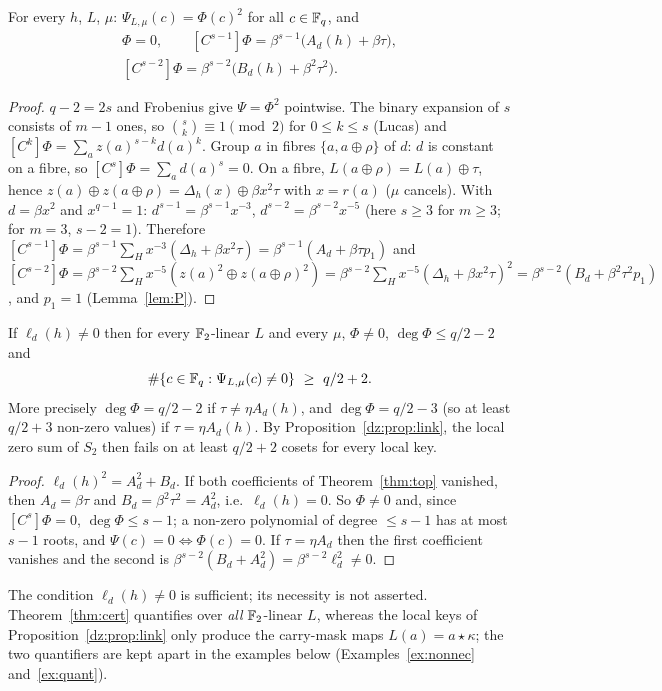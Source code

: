 \begin{theorem}\label{thm:top}
For every $h$, $L$, $\mu$: $\Psi_{L,\mu}(c)=\Phi(c)^2$ for all $c\in\mathbb{F}_q$, and
\begin{gather*}
[C^{s}]\Phi=0,\qquad [C^{s-1}]\Phi=\beta^{s-1}\bigl(A_d(h)+\beta\tau\bigr),\\
[C^{s-2}]\Phi=\beta^{s-2}\bigl(B_d(h)+\beta^2\tau^2\bigr).
\end{gather*}
\end{theorem}
\begin{proof}
$q-2=2s$ and Frobenius give $\Psi=\Phi^2$ pointwise. The binary expansion of $s$ consists of $m-1$ ones, so
$\binom sk\equiv1\pmod2$ for $0\le k\le s$ (Lucas) and $[C^k]\Phi=\sum_az(a)^{s-k}d(a)^k$. Group $a$ in fibres
$\{a,a\oplus\rho\}$ of $d$: $d$ is constant on a fibre, so $[C^s]\Phi=\sum_ad(a)^s=0$. On a fibre,
$L(a\oplus\rho)=L(a)\oplus\tau$, hence $z(a)\oplus z(a\oplus\rho)=\Delta_h(x)\oplus\beta x^2\tau$ with $x=r(a)$
($\mu$ cancels). With $d=\beta x^2$ and $x^{q-1}=1$: $d^{s-1}=\beta^{s-1}x^{-3}$, $d^{s-2}=\beta^{s-2}x^{-5}$
(here $s\ge3$ for $m\ge3$; for $m=3$, $s-2=1$). Therefore
$[C^{s-1}]\Phi=\beta^{s-1}\sum_Hx^{-3}(\Delta_h+\beta x^2\tau)=\beta^{s-1}(A_d+\beta\tau p_1)$ and
$[C^{s-2}]\Phi=\beta^{s-2}\sum_Hx^{-5}(z(a)^2\oplus z(a\oplus\rho)^2)=\beta^{s-2}\sum_Hx^{-5}(\Delta_h+\beta x^2\tau)^2
=\beta^{s-2}(B_d+\beta^2\tau^2p_1)$, and $p_1=1$ (Lemma~\ref{lem:P}).
\end{proof}

\begin{theorem}[Certificate]\label{thm:cert}
If $\ell_d(h)\ne0$ then for every $\mathbb{F}_2$-linear $L$ and every $\mu$, $\Phi\ne0$, $\deg\Phi\le q/2-2$ and
\[
\#\{c\in\Fq:\Psi_{L,\mu}(c)\ne0\}\ \ge\ q/2+2 .
\]
More precisely $\deg\Phi=q/2-2$ if $\tau\ne\eta A_d(h)$, and $\deg\Phi=q/2-3$ (so at least $q/2+3$ non-zero
values) if $\tau=\eta A_d(h)$. By Proposition~\ref{dz:prop:link}, the local zero sum of $S_2$ then fails on at
least $q/2+2$ cosets for every local key.
\end{theorem}
\begin{proof}
$\ell_d(h)^2=A_d^2+B_d$. If both coefficients of Theorem~\ref{thm:top} vanished, then $A_d=\beta\tau$ and
$B_d=\beta^2\tau^2=A_d^2$, i.e.\ $\ell_d(h)=0$. So $\Phi\ne0$ and, since $[C^s]\Phi=0$, $\deg\Phi\le s-1$; a non-zero
polynomial of degree $\le s-1$ has at most $s-1$ roots, and $\Psi(c)=0\iff\Phi(c)=0$. If $\tau=\eta A_d$ then the
first coefficient vanishes and the second is $\beta^{s-2}(B_d+A_d^2)=\beta^{s-2}\ell_d^2\ne0$.
\end{proof}
The condition $\ell_d(h)\ne0$ is sufficient; its necessity is not asserted. Theorem~\ref{thm:cert} quantifies over
\emph{all} $\mathbb{F}_2$-linear $L$, whereas the local keys of Proposition~\ref{dz:prop:link} only produce the carry-mask maps
$L(a)=a\star\kappa$; the two quantifiers are kept apart in the examples below (Examples~\ref{ex:nonnec}
and~\ref{ex:quant}).

